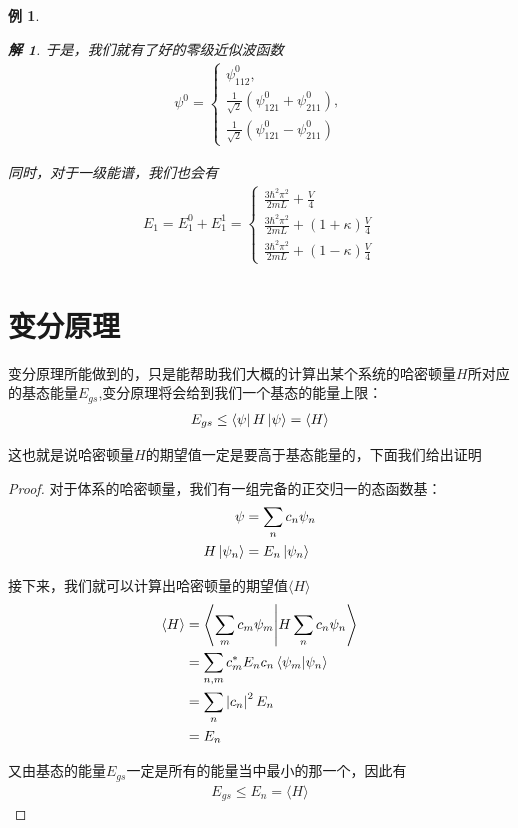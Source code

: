 \documentclass{article}
\newtheorem{example}{例}
\newtheorem{solution}{解}
\newcommand{\expectation}[1]{\langle #1 \rangle}
\begin{document}
\begin{example}
\begin{solution}
		于是，我们就有了好的零级近似波函数
		\begin{align*}
			\displaystyle\psi^0=
			\begin{cases}
				\psi_{112}^0,                                             \\
				\frac{1}{\sqrt{2}}\left(\psi_{121}^0+\psi_{211}^0\right), \\
				\frac{1}{\sqrt{2}}\left(\psi_{121}^0-\psi_{211}^0\right)
			\end{cases}
		\end{align*}

		同时，对于一级能谱，我们也会有
		\begin{align*}
			E_1=E_1^0+E_1^1=
			\begin{cases}
				\frac{3\hbar^2\pi^2}{2mL}+\frac{V}{4}           \\
				\frac{3\hbar^2\pi^2}{2mL}+(1+\kappa)\frac{V}{4} \\
				\frac{3\hbar^2\pi^2}{2mL}+(1-\kappa)\frac{V}{4}
			\end{cases}
		\end{align*}
	\end{solution}
\end{example}

\section{变分原理}
变分原理所能做到的，只是能帮助我们大概的计算出某个系统的哈密顿量$H$所对应的基态能量$E_{gs}$,变分原理将会给到我们一个基态的能量上限：
\begin{align*}
	E_{gs}\leq\bra{\psi}H\ket{\psi}=\expectation{H}
\end{align*}

这也就是说哈密顿量$H$的期望值一定是要高于基态能量的，下面我们给出证明
\begin{proof}
	对于体系的哈密顿量，我们有一组完备的正交归一的态函数基：
	\begin{align*}
		\psi          & =\sum_{n}c_n\psi_n \\
		H\ket{\psi_n} & =E_n\ket{\psi_n}
	\end{align*}

	接下来，我们就可以计算出哈密顿量的期望值$\expectation{H}$
	\begin{align*}
		\expectation{H} & =\braket{\sum_mc_m\psi_m}{H\sum_nc_n\psi_n}   \\
		                & =\sum_{n,m}c_m^*E_nc_n\braket{\psi_m}{\psi_n} \\
		                & =\sum_n\left|c_n\right|^2E_n                  \\
		                & =E_n
	\end{align*}

	又由基态的能量$E_{gs}$一定是所有的能量当中最小的那一个，因此有
	\begin{align*}
		E_{gs}\leq E_n=\expectation{H}
	\end{align*}
\end{proof}
\end{document}
